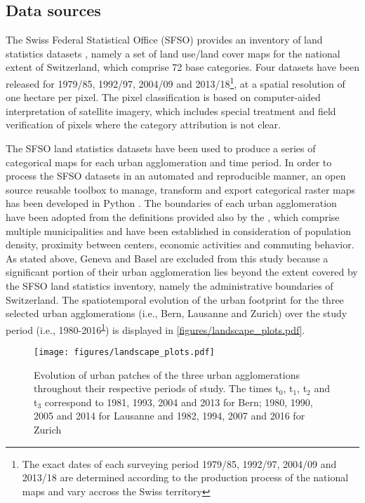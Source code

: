 \subsection*{Data sources}

The Swiss Federal Statistical Office (SFSO) provides an inventory of land statistics datasets , namely a set of land use/land cover maps for the national extent of Switzerland, which comprise 72 base categories. Four datasets have been released for 1979/85, 1992/97, 2004/09 and 2013/18\footnote{\label{fn:years}The exact dates of each surveying period 1979/85, 1992/97, 2004/09 and 2013/18 are determined according to the production process of the national maps and vary accross the Swiss territory }, at a spatial resolution of one hectare per pixel.
The pixel classification is based on computer-aided interpretation of satellite imagery, which includes special treatment and field verification of pixels where the category attribution is not clear.

The SFSO land statistics datasets have been used to produce a series of categorical maps for each urban agglomeration and time period.
In order to process the SFSO datasets in an automated and reproducible manner, an open source reusable toolbox to manage, transform and export categorical raster maps has been developed in Python \citep{bosch2019swisslandstats}.
The boundaries of each urban agglomeration have been adopted from the definitions provided also by the , which comprise multiple municipalities and have been established in consideration of population density, proximity between centers, economic activities and commuting behavior.
As stated above, Geneva and Basel are excluded from this study because a significant portion of their urban agglomeration lies beyond the extent covered by the SFSO land statistics inventory, namely the administrative boundaries of Switzerland.
The spatiotemporal evolution of the urban footprint for the three selected urban agglomerations (i.e., Bern, Lausanne and Zurich) over the study period (i.e., 1980-2016\textsuperscript{\ref{fn:years}}) is displayed in \autoref{figures/landscape_plots.pdf}.

\begin{figure}[!ht]
  \begin{adjustwidth}{0cm}{-.4\textwidth}
    \centering  
    \texttt{[image: figures/landscape\_plots.pdf]}
    \caption[Evolution of urban patches]{\label{figures/landscape_plots.pdf}Evolution of urban patches of the three urban agglomerations throughout their respective periods of study. The times t$_0$, t$_1$, t$_2$ and t$_3$ correspond to 1981, 1993, 2004 and 2013 for Bern; 1980, 1990, 2005 and 2014 for Lausanne and 1982, 1994, 2007 and 2016 for Zurich}
  \end{adjustwidth}
\end{figure}


